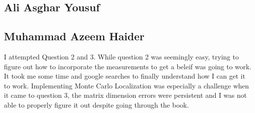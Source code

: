 \documentclass[answers]{exam}
\begin{document}
\begin{questions}
\begin{parts}
\begin{solution}
            \subsection*{Ali Asghar Yousuf}

            \subsection*{Muhammad Azeem Haider}
            I attempted Question 2 and 3. While question 2 was seemingly easy, trying to figure out how to incorporate the measurements to get a beleif was going to work. It took me some time and google searches to finally understand how I can get it to work. Implementing Monte Carlo Localization was especially a challenge when it came to question 3, the matrix dimension errors were persistent and I was not able to properly figure it out despite going through the book. 

        \end{solution}
    \end{parts}
\end{questions}
\end{document}
